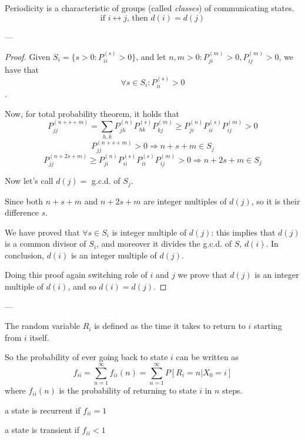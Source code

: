 	\begin{theorem} Periodicity is a characteristic of groups (called \emph{classes}) of communicating states.
		$$\text{if } i \leftrightarrow j \text{, then } d(i) = d(j)$$
	\end{theorem}
	---

	\begin{proof}
		Given $S_i = \{ s>0 : P_{ii}^{(s)} >0 \}$, and let $n, m >0 : P_{ji}^{(m)} >0, P_{ij}^{(m)} > 0$, we have that $$\forall s \in S_i : P_{ii}^{(s)} > 0$$.
		
		Now, for total probability theorem, it holds that 
		$$P_{jj}^{(n+s+m)} = \sum_{h, k} P_{jh}^{(n)} P_{hk}^{(s)} P_{kj}^{(m)} \geq P_{ji}^{(n)} P_{ii}^{(s)} P_{ij}^{(m)} >0 $$
		$$P_{jj}^{(n+s+m)} >0 \Rightarrow n+s+m \in S_j$$
		$$P_{jj}^{(n+2s+m)} \geq P_{ji}^{(n)} P_{ii}^{(s)} P_{ii}^{(s)} P_{ij}^{(m)} >0 \Rightarrow n+2s+m \in S_j$$
		
		Now let's call $d(j) =$ g.c.d. of $S_j$.
		
		Since both $n+s+m$ and $n+2s+m$ are integer multiples of $d(j)$, so it is their difference $s$.
		
		We have proved that $\forall s \in S_i$ is integer multiple of $d(j)$: this implies that $d(j)$ is a common divisor of $S_i$, and moreover it divides the g.c.d. of $S$, $d(i)$. In conclusion, $d(i)$ is an integer multiple of $d(j)$.
		
		Doing this proof again switching role of $i$ and $j$ we prove that $d(j)$ is an integer multiple of $d(i)$, and so $d(i) = d(j)$.
	\end{proof}
	---

	\begin{definition}
		The random variable $R_i$ is defined as the time it takes to return to $i$ starting from $i$ itself.
	\end{definition}

	So the probability of ever going back to state $i$ can be written as
	$$ f_{ii} = \sum_{n=1}^\infty f_{ii}(n)  = \sum_{n=1}^\infty P[R_i=n | X_0=i] $$
	where $f_{ii}(n)$ is the probability of returning to state $i$ in $n$ steps.

	\begin{definition}
		a state is recurrent if $f_{ii} = 1$
	\end{definition}

	\begin{definition}
		a state is transient if  $f_{ii} < 1$
	\end{definition}

